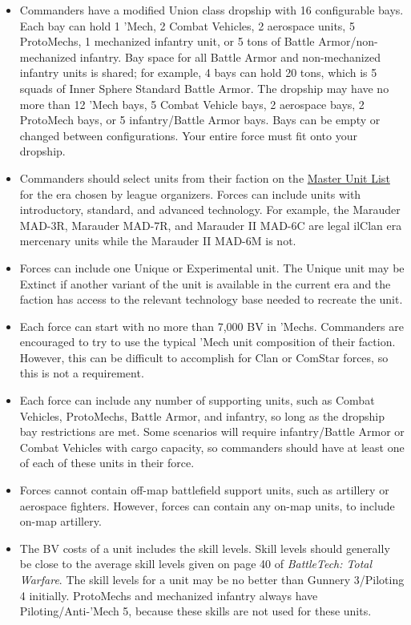 \documentclass{article}
\begin{document}
\begin{itemize}

\item Commanders have a modified Union class dropship with 16 configurable bays.
Each bay can hold 1 'Mech, 2 Combat Vehicles, 2 aerospace units, 5 ProtoMechs, 1 mechanized infantry unit, or 5 tons of Battle Armor/non-mechanized infantry.
Bay space for all Battle Armor and non-mechanized infantry units is shared; for example, 4 bays can hold 20 tons, which is 5 squads of Inner Sphere Standard Battle Armor.
The dropship may have no more than 12 'Mech bays, 5 Combat Vehicle bays, 2 aerospace bays, 2 ProtoMech bays, or 5 infantry/Battle Armor bays.
Bays can be empty or changed between configurations.
Your entire force must fit onto your dropship.

\item Commanders should select units from their faction on the \href{http://www.masterunitlist.info/}{Master Unit List} for the era chosen by league organizers.
Forces can include units with introductory, standard, and advanced technology.
For example, the Marauder MAD-3R, Marauder MAD-7R, and Marauder II MAD-6C are legal ilClan era mercenary units while the Marauder II MAD-6M is not.

\item Forces can include one Unique or Experimental unit.
The Unique unit may be Extinct if another variant of the unit is available in the current era and the faction has access to the relevant technology base needed to recreate the unit.

\item Each force can start with no more than 7,000 BV in 'Mechs.
Commanders are encouraged to try to use the typical 'Mech unit composition of their faction.
However, this can be difficult to accomplish for Clan or ComStar forces, so this is not a requirement.

\item Each force can include any number of supporting units, such as Combat Vehicles, ProtoMechs, Battle Armor, and infantry, so long as the dropship bay restrictions are met.
Some scenarios will require infantry/Battle Armor or Combat Vehicles with cargo capacity, so commanders should have at least one of each of these units in their force.

\item Forces cannot contain off-map battlefield support units, such as artillery or aerospace fighters.
However, forces can contain any on-map units, to include on-map artillery.

\item The BV costs of a unit includes the skill levels.
Skill levels should generally be close to the average skill levels given on page 40 of \emph{BattleTech: Total Warfare}.
The skill levels for a unit may be no better than Gunnery 3/Piloting 4 initially.
ProtoMechs and mechanized infantry always have Piloting/Anti-'Mech 5, because these skills are not used for these units.

\end{itemize}
\end{document}
